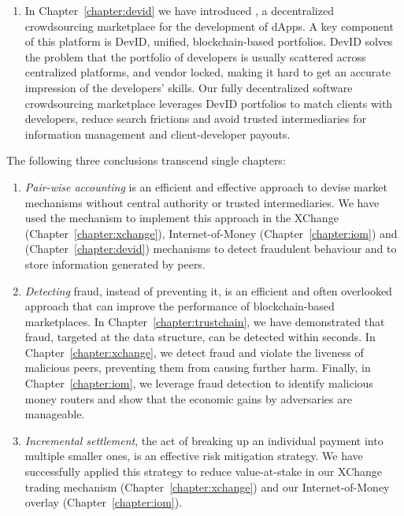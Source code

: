 \begin{enumerate}
	\item In Chapter~\ref{chapter:devid} we have introduced \Dappcoder{}, a decentralized crowdsourcing marketplace for the development of dApps.
	A key component of this platform is DevID, unified, blockchain-based portfolios.
	DevID solves the problem that the portfolio of developers is usually scattered across centralized platforms, and vendor locked, making it hard to get an accurate impression of the developers' skills.
	Our fully decentralized software crowdsourcing marketplace leverages DevID portfolios to match clients with developers, reduce search frictions and avoid trusted intermediaries for information management and client-developer payouts.
\end{enumerate}

\noindent The following three conclusions transcend single chapters:

\begin{enumerate}[resume]	
	\item \emph{Pair-wise accounting} is an efficient and effective approach to devise market mechanisms without central authority or trusted intermediaries.
	We have used the \TrustChain{} mechanism to implement this approach in the XChange (Chapter~\ref{chapter:xchange}), Internet-of-Money (Chapter~\ref{chapter:iom}) and \Dappcoder{} (Chapter~\ref{chapter:devid}) mechanisms to detect fraudulent behaviour and to store information generated by peers.
	
	\item \emph{Detecting} fraud, instead of preventing it, is an efficient and often overlooked approach that can improve the performance of blockchain-based marketplaces.
	In Chapter~\ref{chapter:trustchain}, we have demonstrated that fraud, targeted at the \TrustChain{} data structure, can be detected within seconds.
	In Chapter~\ref{chapter:xchange}, we detect fraud and violate the liveness of malicious peers, preventing them from causing further harm.
	Finally, in Chapter~\ref{chapter:iom}, we leverage fraud detection to identify malicious money routers and show that the economic gains by adversaries are manageable.
	
	\item \emph{Incremental settlement}, the act of breaking up an individual payment into multiple smaller ones, is an effective risk mitigation strategy.
	We have successfully applied this strategy to reduce value-at-stake in our XChange trading mechanism (Chapter~\ref{chapter:xchange}) and our Internet-of-Money overlay (Chapter~\ref{chapter:iom}).
	
\end{enumerate}

